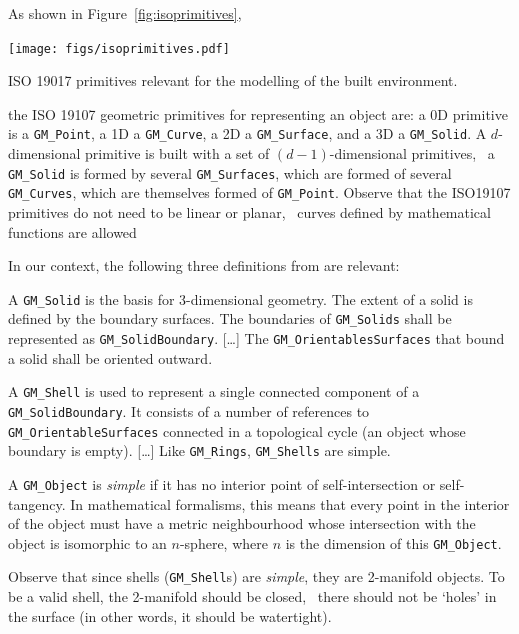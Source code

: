 As shown in Figure~\ref{fig:isoprimitives}, 
\begin{marginfigure}
  \centering
  \texttt{[image: figs/isoprimitives.pdf]}
  \caption{ISO 19017 primitives relevant for the modelling of the built environment.}%
\label{fig:isoprimitives}
\end{marginfigure}
the ISO 19107 geometric primitives for representing an object are: a 0D primitive is a \texttt{GM\_Point}, a 1D a \texttt{GM\_Curve}, a 2D a \texttt{GM\_Surface}, and a 3D a \texttt{GM\_Solid}.
A $d$-dimensional primitive is built with a set of $(d-1)$-dimensional primitives, \eg\ a \texttt{GM\_Solid} is formed by several \texttt{GM\_Surfaces}, which are formed of several \texttt{GM\_Curves}, which are themselves formed of \texttt{GM\_Point}.
Observe that the ISO19107 primitives do not need to be linear or planar, \ie\ curves defined by mathematical functions are allowed

%

In our context, the following three definitions from \citet{ISO19107} are relevant:
\begin{definition}
A \texttt{GM\_Solid} is the basis for 3-dimensional geometry. 
The extent of a solid is defined by the boundary surfaces.
The boundaries of \texttt{GM\_Solids} shall be represented as \texttt{GM\_SolidBoundary}.
[\ldots] 
The \texttt{GM\_OrientablesSurfaces} that bound a solid shall be oriented outward.
\end{definition}
\begin{definition}
A \texttt{GM\_Shell} is used to represent a single connected component of a \texttt{GM\_SolidBoundary}. 
It consists of a number of references to \texttt{GM\_OrientableSurfaces} connected in a topological cycle (an object whose boundary is empty). 
[\ldots] 
Like \texttt{GM\_Rings}, \texttt{GM\_Shells} are simple.
\end{definition}
\begin{definition}
A \texttt{GM\_Object} is \emph{simple} if it has no interior point of self-intersection or self-tangency. 
In mathematical formalisms, this means that every point in the interior of the object must have a metric neighbourhood whose intersection with the object is isomorphic to an $n$-sphere, where $n$ is the dimension of this \texttt{GM\_Object}.
\end{definition}

%

Observe that since shells (\texttt{GM\_Shell}s) are \emph{simple}, they are 2-manifold objects.
To be a valid shell, the 2-manifold should be closed, \ie\ there should not be `holes' in the surface (in other words, it should be watertight).

